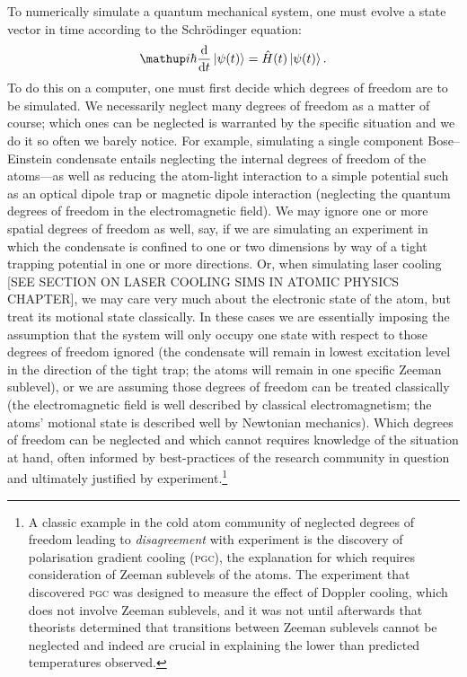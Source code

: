 To numerically simulate a quantum mechanical system, one must evolve a state vector in time according to the Schr\"odinger equation:
\begin{align}\label{eq:schrodinger_equation}
\ii\hbar\dv{t}\ket{\psi(t)} = \hat H (t) \ket{\psi(t)}.
\end{align}
To do this on a computer, one must first decide which degrees of freedom are to be simulated. We necessarily neglect many degrees of freedom as a matter of course; which ones can be neglected is warranted by the specific situation and we do it so often we barely notice. For example, simulating a single component Bose--Einstein condensate entails neglecting the internal degrees of freedom of the atoms---as well as reducing the atom-light interaction to a simple potential such as an optical dipole trap or magnetic dipole interaction (neglecting the quantum degrees of freedom in the electromagnetic field). We may ignore one or more spatial degrees of freedom as well, say, if we are simulating an experiment in which the condensate is confined to one or two dimensions \cite{gorlitz_realization_2001, hofferberth_non-equilibrium_2007, rauer_cooling_2016} by way of a tight trapping potential in one or more directions. Or, when simulating laser cooling [SEE SECTION ON LASER COOLING SIMS IN ATOMIC PHYSICS CHAPTER], we may care very much about the electronic state of the atom, but treat its motional state classically. In these cases we are essentially imposing the assumption that the system will only occupy one state with respect to those degrees of freedom ignored (the condensate will remain in lowest excitation level in the direction of the tight trap; the atoms will remain in one specific Zeeman sublevel), or we are assuming those degrees of freedom can be treated classically (the electromagnetic field is well described by classical electromagnetism; the atoms' motional state is described well by Newtonian mechanics). Which degrees of freedom can be neglected and which cannot requires knowledge of the situation at hand, often informed by best-practices of the research community in question and ultimately justified by experiment.\footnote{A classic example in the cold atom community of neglected degrees of freedom leading to \emph{disagreement} with experiment is the discovery of polarisation gradient cooling (\textsc{pgc}), the explanation for which requires consideration of Zeeman sublevels of the atoms. The experiment that discovered \textsc{pgc} \cite{lett_observation_1988} was designed to measure the effect of Doppler cooling, which does not involve Zeeman sublevels, and it was not until afterwards that theorists determined \cite{dalibard_laser_1989} that transitions between Zeeman sublevels cannot be neglected and indeed are crucial in explaining the lower than predicted temperatures observed.}

